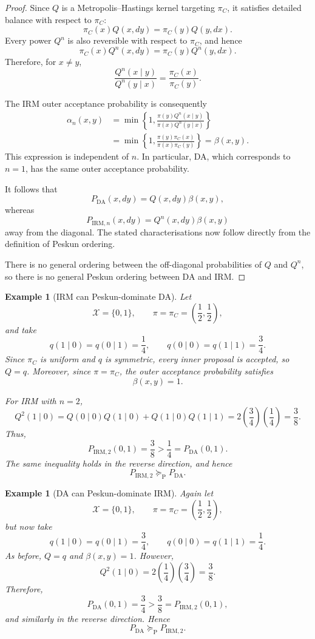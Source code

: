 \documentclass[12pt]{article}
\theoremstyle{definition}
\theoremstyle{remark}
\theoremstyle{plain}
\newtheorem{example}[theorem]{Example}
\begin{document}
\begin{proof}
Since $Q$ is a Metropolis--Hastings kernel targeting $\pi_C$, it
satisfies detailed balance with respect to $\pi_C$:
\[
\pi_C(x)Q(x,dy)
=
\pi_C(y)Q(y,dx).
\]
Every power $Q^n$ is also reversible with respect to $\pi_C$, and hence
\[
\pi_C(x)Q^n(x,dy)
=
\pi_C(y)Q^n(y,dx).
\]
Therefore, for $x\neq y$,
\[
\frac{Q^n(x\mid y)}{Q^n(y\mid x)}
=
\frac{\pi_C(x)}{\pi_C(y)}.
\]

The IRM outer acceptance probability is consequently
\[
\begin{aligned}
\alpha_n(x,y)
&=
\min\left\{
1,
\frac{\pi(y)Q^n(x\mid y)}
      {\pi(x)Q^n(y\mid x)}
\right\} \\
&=
\min\left\{
1,
\frac{\pi(y)\pi_C(x)}
      {\pi(x)\pi_C(y)}
\right\}
=
\beta(x,y).
\end{aligned}
\]
This expression is independent of $n$. In particular, DA, which corresponds to $n=1$, has the same outer acceptance
probability.

It follows that
\[
P_{\mathrm{DA}}(x,dy)
=
Q(x,dy)\beta(x,y),
\]
whereas
\[
P_{\mathrm{IRM},n}(x,dy)
=
Q^n(x,dy)\beta(x,y)
\]
away from the diagonal. The stated characterisations now follow
directly from the definition of Peskun ordering.

There is no general ordering between the off-diagonal probabilities
of $Q$ and $Q^n$, so there is no general Peskun ordering between
DA and IRM.
\end{proof}

\begin{example}[IRM can Peskun-dominate DA]
Let
\[
\mathcal X=\{0,1\},
\qquad
\pi=\pi_C=\left(\frac12,\frac12\right),
\]
and take
\[
q(1\mid0)=q(0\mid1)=\frac14,
\qquad
q(0\mid0)=q(1\mid1)=\frac34.
\]
Since $\pi_C$ is uniform and $q$ is symmetric, every inner proposal is
accepted, so $Q=q$. Moreover, since $\pi=\pi_C$, the outer acceptance
probability satisfies
\[
\beta(x,y)=1.
\]

For IRM with $n=2$,
\[
Q^2(1\mid0)
=
Q(0\mid0)Q(1\mid0)
+
Q(1\mid0)Q(1\mid1)
=
2\left(\frac34\right)\left(\frac14\right)
=
\frac38.
\]
Thus,
\[
P_{\mathrm{IRM},2}(0,1)
=
\frac38
>
\frac14
=
P_{\mathrm{DA}}(0,1).
\]
The same inequality holds in the reverse direction, and hence
\[
P_{\mathrm{IRM},2}
\succeq_{\mathrm P}
P_{\mathrm{DA}}.
\]
\end{example}

\begin{example}[DA can Peskun-dominate IRM]
Again let
\[
\mathcal X=\{0,1\},
\qquad
\pi=\pi_C=\left(\frac12,\frac12\right),
\]
but now take
\[
q(1\mid0)=q(0\mid1)=\frac34,
\qquad
q(0\mid0)=q(1\mid1)=\frac14.
\]
As before, $Q=q$ and $\beta(x,y)=1$. However,
\[
Q^2(1\mid0)
=
2\left(\frac14\right)\left(\frac34\right)
=
\frac38.
\]
Therefore,
\[
P_{\mathrm{DA}}(0,1)
=
\frac34
>
\frac38
=
P_{\mathrm{IRM},2}(0,1),
\]
and similarly in the reverse direction. Hence
\[
P_{\mathrm{DA}}
\succeq_{\mathrm P}
P_{\mathrm{IRM},2}.
\]
\end{example}
\end{document}
